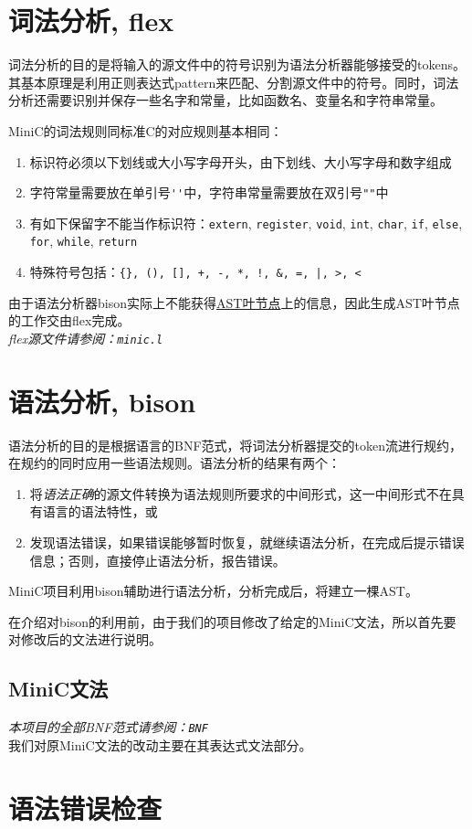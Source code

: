 \section{词法分析, flex}
\label{flex}
词法分析的目的是将输入的源文件中的符号识别为语法分析器能够接受的tokens。其基本原理是利用正则表达式pattern来匹配、分割源文件中的符号。同时，词法分析还需要识别并保存一些名字和常量，比如函数名、变量名和字符串常量。

MiniC的词法规则同标准C的对应规则基本相同：
\begin{enumerate}
	\item 标识符必须以下划线或大小写字母开头，由下划线、大小写字母和数字组成
	\item 字符常量需要放在单引号\verb|''|中，字符串常量需要放在双引号\verb|""|中
	\item 有如下保留字不能当作标识符：\verb|extern|, \verb|register|, \verb|void|, \verb|int|, \verb|char|, \verb|if|, \verb|else|, \verb|for|, \verb|while|, \verb|return|
	\item 特殊符号包括：\verb#{}, (), [], +, -, *, !, &, =, |, >, <#
\end{enumerate}
由于语法分析器bison实际上不能获得\hyperref[ASTnode]{AST叶节点}上的信息，因此生成AST叶节点的工作交由flex完成。\\
\noindent
{\it \anchor flex源文件请参阅：\verb|minic.l|}
\section{语法分析, bison}
\label{bison}
语法分析的目的是根据语言的BNF范式，将词法分析器提交的token流进行规约，在规约的同时应用一些语法规则。语法分析的结果有两个：
\begin{enumerate}
	\item 将\emph{语法正确}的源文件转换为语法规则所要求的中间形式，这一中间形式不在具有语言的语法特性，或
	\item 发现语法错误，如果错误能够暂时恢复，就继续语法分析，在完成后提示错误信息；否则，直接停止语法分析，报告错误。
\end{enumerate}
MiniC项目利用bison辅助进行语法分析，分析完成后，将建立一棵AST。

在介绍对bison的利用前，由于我们的项目修改了给定的MiniC文法，所以首先要对修改后的文法进行说明。
\subsection{MiniC文法}
{\noindent \it \anchor 本项目的全部BNF范式请参阅：\verb|BNF|}\\
我们对原MiniC文法的改动主要在其表达式文法部分。

\section{语法错误检查}
